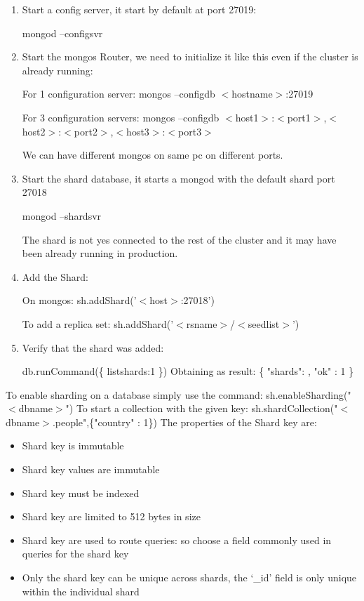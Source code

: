 \documentclass[a4page, 11pt]{article}
\begin{document}
\begin{enumerate}[noitemsep]
	\item Start a config server, it start by default at port 27019:

	mongod --configsvr
	\item Start the mongos Router, we need to initialize it like this even if the cluster is already running:
	
	For 1 configuration server: 
	mongos --configdb $<$hostname$>$:27019
	
	For 3 configuration servers:
	mongos --configdb $<$host1$>$:$<$port1$>$,$<$host2$>$:$<$port2$>$,$<$host3$>$:$<$port3$>$
	
	We can have different mongos on same pc on different ports.
	\item Start the shard database, it starts a mongod with the default shard port 27018
	
	mongod --shardsvr
	
	The shard is not yes connected to the rest of the cluster and it may have been already running in production.
	\item Add the Shard:
	
	On mongos: 
	sh.addShard('$<$host$>$:27018')
	
	To add a replica set: 
	sh.addShard('$<$rsname$>$/$<$seedlist$>$')
	\item Verify that the shard was added:
	
	db.runCommand(\{ listshards:1 \}) \newline
	Obtaining as result: \newline
	\{\newline
	"shards": , \newline
	"ok" : 1 \newline
	\}
\end{enumerate} 
To enable sharding on a database simply use the command: sh.enableSharding("$<$dbname$>$") 
\newline To start a collection with the given key:
sh.shardCollection("$<$dbname$>.$people",\{"country" : 1\})
\newline
The properties of the Shard key are:
\begin{itemize}[noitemsep]
	\item Shard key is immutable
	\item Shard key values are immutable
	\item Shard key must be indexed
	\item Shard key are limited to 512 bytes in size
	\item Shard key are used to route queries: so choose a field commonly used in queries for the shard key
	\item Only the shard key can be unique across shards, the `\_id' field is only unique within the individual shard
\end{itemize}
\end{document}
